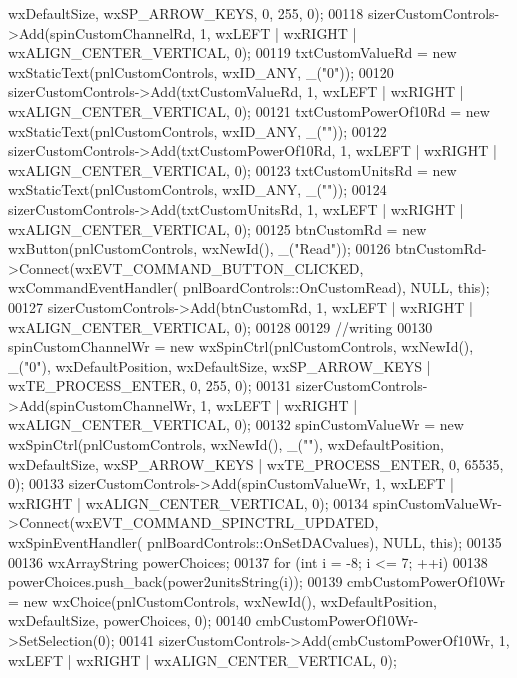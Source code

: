\begin{DoxyCode}
      wxDefaultSize, wxSP\_ARROW\_KEYS, 0, 255, 0);
00118     sizerCustomControls->Add(spinCustomChannelRd, 1, wxLEFT | wxRIGHT | wxALIGN\_CENTER\_VERTICAL, 0);
00119     txtCustomValueRd = \textcolor{keyword}{new} wxStaticText(pnlCustomControls, wxID\_ANY, \_(\textcolor{stringliteral}{"0"}));
00120     sizerCustomControls->Add(txtCustomValueRd, 1, wxLEFT | wxRIGHT | wxALIGN\_CENTER\_VERTICAL, 0);
00121     txtCustomPowerOf10Rd = \textcolor{keyword}{new} wxStaticText(pnlCustomControls, wxID\_ANY, \_(\textcolor{stringliteral}{""}));
00122     sizerCustomControls->Add(txtCustomPowerOf10Rd, 1, wxLEFT | wxRIGHT | wxALIGN\_CENTER\_VERTICAL, 0);
00123     txtCustomUnitsRd = \textcolor{keyword}{new} wxStaticText(pnlCustomControls, wxID\_ANY, \_(\textcolor{stringliteral}{""}));
00124     sizerCustomControls->Add(txtCustomUnitsRd, 1, wxLEFT | wxRIGHT | wxALIGN\_CENTER\_VERTICAL, 0);
00125     btnCustomRd = \textcolor{keyword}{new} wxButton(pnlCustomControls, wxNewId(), \_(\textcolor{stringliteral}{"Read"}));
00126     btnCustomRd->Connect(wxEVT\_COMMAND\_BUTTON\_CLICKED, wxCommandEventHandler(
      pnlBoardControls::OnCustomRead), NULL, \textcolor{keyword}{this});
00127     sizerCustomControls->Add(btnCustomRd, 1, wxLEFT | wxRIGHT | wxALIGN\_CENTER\_VERTICAL, 0);
00128 
00129     \textcolor{comment}{//writing}
00130     spinCustomChannelWr = \textcolor{keyword}{new} wxSpinCtrl(pnlCustomControls, wxNewId(), \_(\textcolor{stringliteral}{"0"}), wxDefaultPosition, 
      wxDefaultSize, wxSP\_ARROW\_KEYS | wxTE\_PROCESS\_ENTER, 0, 255, 0);
00131     sizerCustomControls->Add(spinCustomChannelWr, 1, wxLEFT | wxRIGHT | wxALIGN\_CENTER\_VERTICAL, 0);
00132     spinCustomValueWr = \textcolor{keyword}{new} wxSpinCtrl(pnlCustomControls, wxNewId(), \_(\textcolor{stringliteral}{""}), wxDefaultPosition, 
      wxDefaultSize, wxSP\_ARROW\_KEYS | wxTE\_PROCESS\_ENTER, 0, 65535, 0);
00133     sizerCustomControls->Add(spinCustomValueWr, 1, wxLEFT | wxRIGHT | wxALIGN\_CENTER\_VERTICAL, 0);
00134     spinCustomValueWr->Connect(wxEVT\_COMMAND\_SPINCTRL\_UPDATED, wxSpinEventHandler(
      pnlBoardControls::OnSetDACvalues), NULL, \textcolor{keyword}{this});
00135 
00136     wxArrayString powerChoices;
00137     \textcolor{keywordflow}{for} (\textcolor{keywordtype}{int} i = -8; i <= 7; ++i)
00138         powerChoices.push\_back(power2unitsString(i));
00139     cmbCustomPowerOf10Wr = \textcolor{keyword}{new} wxChoice(pnlCustomControls, wxNewId(), wxDefaultPosition, wxDefaultSize, 
      powerChoices, 0);
00140     cmbCustomPowerOf10Wr->SetSelection(0);
00141     sizerCustomControls->Add(cmbCustomPowerOf10Wr, 1, wxLEFT | wxRIGHT | wxALIGN\_CENTER\_VERTICAL, 0);

\end{DoxyCode}
